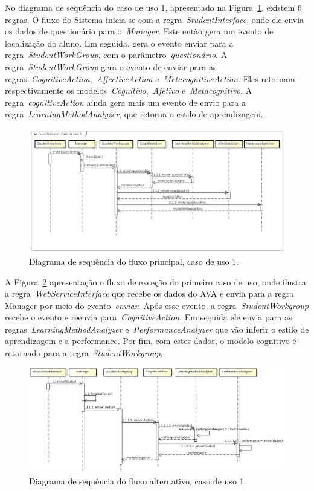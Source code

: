 No diagrama de sequência do caso de uso 1, apresentado na Figura~\ref{fig:dss-uc1-fluxo-principal}, existem 6 regras. O fluxo do Sistema inicia-se com a regra~\emph{StudentInterface}, onde ele envia os dados de questionário para o~\emph{Manager}. Este então gera um evento de localização do aluno. Em seguida, gera o evento enviar para a regra~\emph{StudentWorkGroup}, com o parâmetro~\emph{questionário}. A regra~\emph{StudentWorkGroup} gera o evento de enviar para as regras~\emph{CognitiveAction},~\emph{AffectiveAction} e~\emph{MetacognitiveAction}. Eles retornam respectivamente os modelos~\emph{Cognitivo},~\emph{Afetivo} e~\emph{Metacognitivo}. A regra~\emph{cognitiveAction} ainda gera mais um evento de envio para a regra~\emph{LearningMethodAnalyzer}, que retorna o estilo de aprendizagem.

\begin{figure}
	\centering
	\includegraphics[scale=0.52]{images/dss-uc1-fluxo-principal.png}
	\caption{Diagrama de sequência do fluxo principal, caso de uso 1.}
	\label{fig:dss-uc1-fluxo-principal}
\end{figure}

A Figura~\ref{fig:dss-uc1-fluxo-alternativo} apresentação o fluxo de exceção do primeiro caso de uso, onde ilustra a regra~\emph{WebServiceInterface} que recebe os dados do AVA e envia para a regra Manager por meio do evento~\emph{enviar}. Após esse evento, a regra~\emph{StudentWorkgroup} recebe o evento e reenvia para~\emph{CognitiveAction}. Em seguida ele envia para as regras~\emph{LearningMethodAnalyzer} e~\emph{PerformanceAnalyzer} que vão inferir o estilo de aprendizagem e a performance. Por fim, com estes dados, o modelo cognitivo é retornado para a regra~\emph{StudentWorkgroup}.

\begin{figure}
	\includegraphics[scale=0.52]{images/dss-uc1-fluxo-alternativo.png}
	\caption{Diagrama de sequência do fluxo alternativo, caso de uso 1.}
	\label{fig:dss-uc1-fluxo-alternativo}
\end{figure}

